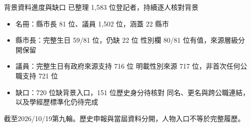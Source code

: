 \documentclass[aspectratio=169,11pt]{beamer}
\begin{document}
\begin{frame}{背景資料進度與缺口}
{\color{accent}\large 已整理 1,583 位登記者，持續逐人核對背景}\par\vspace{4mm}
\begin{itemize}\setlength{\itemsep}{3mm}
\item 名冊：縣市長 81 位、議員 1,502 位，涵蓋 22 縣市
\item 縣市長：完整生日 59/81 位，仍缺 22 位\newline
      性別欄 80/81 位有值，來源層級分開保留
\item 議員：完整生日有政府來源支持 716 位\newline
      明載性別來源 717 位，非首次任何公職支持 721 位
\item 缺口：720 位缺背景入口，151 位歷史身分待核對\newline
      同名、更名與跨公職連結，以及學經歷標準化仍待完成
\end{itemize}
\vspace{3mm}
{\scriptsize 截至2026/10/19第九輪。歷史申報與當屆資料分開，人物入口不等於完整履歷。}
\end{frame}
\end{document}
